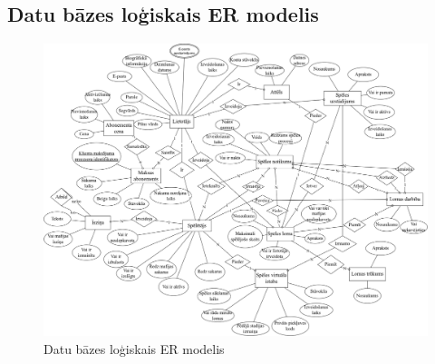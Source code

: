 \subsection{Datu bāzes loģiskais ER modelis}
\begin{figure}[htbp]
	\centering
	\includegraphics[width=\linewidth]{./src/img/KonceptualaisERModelis.png} %
	\caption{Datu bāzes loģiskais ER modelis}
	\label{fig:logical-model}
\end{figure}
